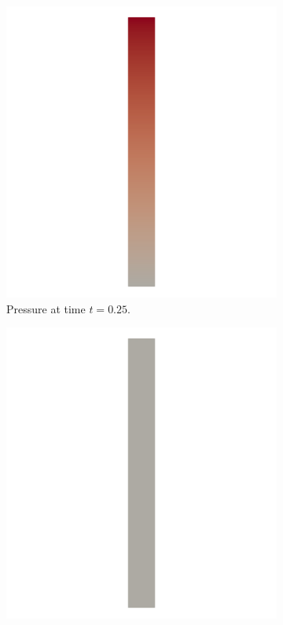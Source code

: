 \documentclass[a4paper,11pt,oneside]{book}
\begin{document}
\begin{figure}[h!]
\begin{subfigure}[b]{0.5\linewidth}
    \includegraphics[width=1.2\linewidth]{images/pressure_fixed_025.png}
        \centering 
    \caption{Pressure at time $t = 0.25$.} 
    \label{fig4:b} 
    \vspace{4ex}
  \end{subfigure} 
  \begin{subfigure}[b]{0.5\linewidth}
    \centering
    \includegraphics[width=1.2\linewidth]{images/pressure_fixed_050.png} 

\end{subfigure}
\end{figure}
\end{document}
